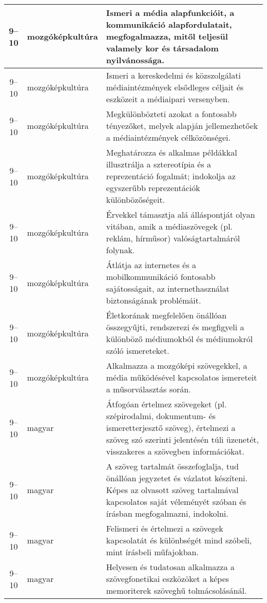 \begin{small}
\begin{longtable}{c | p{2cm} |  p{11cm} }
              9--10 & mozgóképkultúra & Ismeri a média alapfunkcióit, a kommunikáció alapfordulatait, megfogalmazza, mitől teljesül valamely kor és társadalom nyilvánossága. \\ \hline
              9--10 & mozgóképkultúra & Ismeri a kereskedelmi és közszolgálati médiaintézmények elsődleges céljait és eszközeit a médiaipari versenyben. \\ \hline
              9--10 & mozgóképkultúra & Megkülönbözteti azokat a fontosabb tényezőket, melyek alapján jellemezhetőek a médiaintézmények célközönségei. \\ \hline
              9--10 & mozgóképkultúra & Meghatározza és alkalmas példákkal illusztrálja a sztereotípia és a reprezentáció fogalmát; indokolja az egyszerűbb reprezentációk különbözőségeit. \\ \hline
              9--10 & mozgóképkultúra & Érvekkel támasztja alá álláspontját olyan vitában, amik a médiaszövegek (pl. reklám, hírműsor) valóságtartalmáról folynak. \\ \hline
              9--10 & mozgóképkultúra & Átlátja az internetes és a mobilkommunikáció fontosabb sajátosságait, az internethasználat biztonságának problémáit. \\ \hline
              9--10 & mozgóképkultúra & Életkorának megfelelően önállóan összegyűjti, rendszerezi és megfigyeli a különböző  médiumokból és médiumokról szóló ismereteket. \\ \hline
              9--10 & mozgóképkultúra & Alkalmazza a mozgóképi szövegekkel, a média működésével kapcsolatos ismereteit a műsorválasztás során.  \\ \hline
              9--10 & magyar & Átfogóan értelmez szövegeket (pl. szépirodalmi, dokumentum- és ismeretterjesztő szöveg), értelmezi a szöveg szó szerinti jelentésén túli üzenetét, visszakeres a szövegben információkat. \\ \hline
              9--10 & magyar & A szöveg tartalmát összefoglalja, tud önállóan jegyzetet és vázlatot készíteni. Képes az olvasott szöveg tartalmával kapcsolatos saját véleményét szóban és írásban megfogalmazni, indokolni. \\ \hline
              9--10 & magyar & Felismeri és értelmezi a szövegek kapcsolatát és különbségét mind szóbeli, mint írásbeli műfajokban. \\ \hline
              9--10 & magyar & Helyesen és tudatosan alkalmazza a szövegfonetikai eszközöket a képes memoriterek szöveghű tolmácsolásánál. \\ \hline

\end{longtable}
\end{small}
